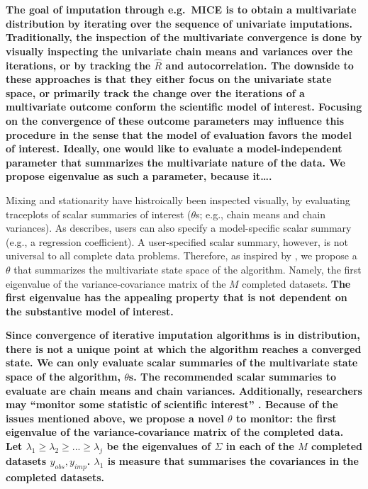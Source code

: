 \documentclass[Royal,times,sageh]{sagej}
\begin{document}
\textbf{The goal of imputation through e.g.~MICE is to obtain a
multivariate distribution by iterating over the sequence of univariate
imputations. Traditionally, the inspection of the multivariate
convergence is done by visually inspecting the univariate chain means
and variances over the iterations, or by tracking the \(\widehat{R}\)
and autocorrelation. The downside to these approaches is that they
either focus on the univariate state space, or primarily track the
change over the iterations of a multivariate outcome conform the
scientific model of interest. Focusing on the convergence of these
outcome parameters may influence this procedure in the sense that the
model of evaluation favors the model of interest. Ideally, one would
like to evaluate a model-independent parameter that summarizes the
multivariate nature of the data. We propose eigenvalue as such a
parameter, because it\ldots. }

Mixing and stationarity have histroically been inspected visually, by
evaluating traceplots of scalar summaries of interest (\(\theta\)s;
e.g., chain means and chain variances). As \citet{buur18} describes,
users can also specify a model-specific scalar summary (e.g., a
regression coefficient). A user-specified scalar summary, however, is
not universal to all complete data problems. Therefore, as inspired by
\citep{mack03}, we propose a \(\theta\) that summarizes the multivariate
state space of the algorithm. Namely, the first eigenvalue of the
variance-covariance matrix of the \(M\) completed datasets. \textbf{The
first eigenvalue has the appealing property that is not dependent on the
substantive model of interest.}

\textbf{Since convergence of iterative imputation algorithms is in
distribution, there is not a unique point at which the algorithm reaches
a converged state. We can only evaluate scalar summaries of the
multivariate state space of the algorithm, \(\theta\)s. The recommended
scalar summaries to evaluate are chain means and chain variances.
Additionally, researchers may ``monitor some statistic of scientific
interest'' \citep[\(\S\) 6.5.2]{buur18}. Because of the issues mentioned
above, we propose a novel \(\theta\) to monitor: the first eigenvalue of
the variance-covariance matrix of the completed data. Let
\(\lambda_1 \geq \lambda_2 \geq ... \geq \lambda_j\) be the eigenvalues
of \(\Sigma\) in each of the \(M\) completed datasets
\({y_{obs}, y_{imp}}\). \(\lambda_1\) is measure that summarises the
covariances in the completed datasets.}
\end{document}
